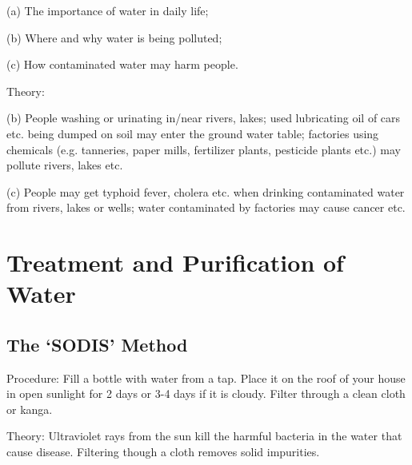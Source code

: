 \begin{multicols}{2}
\begin{description*}
{(a) The importance of water in daily life;

(b) Where and why water is being polluted;

(c) How contaminated water may harm people.}
\item[Theory:]{(b) People washing or urinating in/near
rivers, lakes; used lubricating oil of cars etc.
being dumped on soil may enter the ground
water table; factories using chemicals (e.g.
tanneries, paper mills, fertilizer plants, pesticide
plants etc.) may pollute rivers, lakes etc.

(c) People may get typhoid fever, cholera etc.
when drinking contaminated water from rivers,
lakes or wells; water contaminated by factories
may cause cancer etc.}
\end{description*}


\section*{Treatment and Purification of Water}


\subsection{The `SODIS' Method} %


\begin{description*}
\item[Procedure:]{Fill a bottle with water from a tap. Place it on the roof of your house in open sunlight for 2 days or 3-4 days if it is cloudy. Filter through a clean cloth or kanga.}
\item[Theory:]{Ultraviolet rays from the sun kill the harmful bacteria in the water that cause disease. Filtering though a cloth removes solid impurities.}
\end{description*}


\end{multicols}
